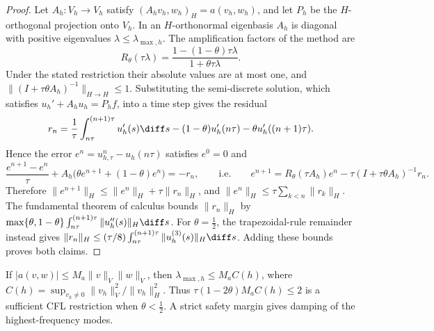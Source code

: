 \begin{proof}
    Let $A_h:V_h\to V_h$ satisfy $(A_hv_h,w_h)_H=a(v_h,w_h)$, and let $P_h$ be the $H$-orthogonal projection onto $V_h$. In an $H$-orthonormal eigenbasis $A_h$ is diagonal with positive eigenvalues $\lambda \le \lambda_{\max,h}$. The amplification factors of the method are
    \begin{equation*}
        R_\theta(\tau\lambda)=\frac{1-(1-\theta)\tau\lambda}{1+\theta\tau\lambda}.
    \end{equation*}
    Under the stated restriction their absolute values are at most one, and $\|(I+\tau\theta A_h)^{-1}\|_{H\to H}\le1$.
    Substituting the semi-discrete solution, which satisfies $u_h' + A_h u_h = P_h f$, into a time step gives the residual
    \begin{equation*}
        r_n=\frac1\tau\int_{n\tau}^{(n+1)\tau}u_h'(s)\diff s
        -(1-\theta)u_h'(n\tau)-\theta u_h'((n+1)\tau).
    \end{equation*}
    Hence the error $e^n = u_{h,\tau}^n - u_h(n\tau)$ satisfies $e^0 = 0$ and
    \begin{equation*}
        \frac{e^{n+1} - e^n}{\tau} + A_h\big(\theta e^{n+1} + (1-\theta) e^n\big) = - r_n,
        \qquad\text{i.e.}\qquad
        e^{n+1} = R_\theta(\tau A_h) e^n - \tau (I + \tau\theta A_h)^{-1} r_n .
    \end{equation*}
    Therefore $\|e^{n+1}\|_H \le \|e^n\|_H + \tau \|r_n\|_H$, and $\|e^n\|_H \le \tau \sum_{k < n} \|r_k\|_H$.
    The fundamental theorem of calculus bounds $\|r_n\|_H$ by
    $\max\{\theta,1-\theta\}\int_{n\tau}^{(n+1)\tau}\|u_h''(s)\|_H\diff s$.
    For $\theta=\frac12$, the trapezoidal-rule remainder instead gives
    $\|r_n\|_H\le(\tau/8)\int_{n\tau}^{(n+1)\tau}\|u_h^{(3)}(s)\|_H\diff s$.
    Adding these bounds proves both claims.
\end{proof}

\begin{remark}
    If $|a(v,w)|\le M_a\|v\|_V\|w\|_V$, then $\lambda_{\max,h}\le M_a C(h)$, where $C(h)=\sup_{v_h\ne0}\|v_h\|_V^2/\|v_h\|_H^2$. Thus $\tau(1-2\theta)M_aC(h)\le2$ is a sufficient CFL restriction when $\theta<\frac12$. A strict safety margin gives damping of the highest-frequency modes.
\end{remark}


